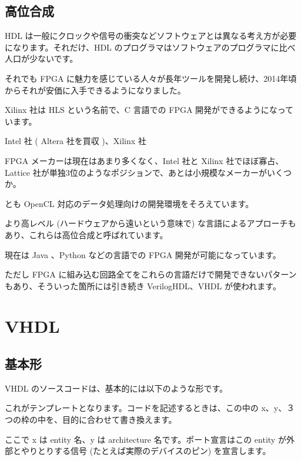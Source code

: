 \documentclass[letterpaper,10pt,dvipdfmx]{sphinxmanual}
\begin{document}
\section{高位合成}
\label{\detokenize{03_fpga:id1}}
HDL は一般にクロックや信号の衝突などソフトウェアとは異なる考え方が必要になります。それだけ、HDL のプログラマはソフトウェアのプログラマに比べ人口が少ないです。

それでも FPGA に魅力を感じている人々が長年ツールを開発し続け、2014年頃からそれが安価に入手できるようになりました。

Xilinx 社は HLS という名前で、C 言語での FPGA 開発ができるようになっています。

Intel 社 ( Altera 社を買収 )、Xilinx 社 %
\begin{footnote}[1]\sphinxAtStartFootnote
FPGA メーカーは現在はあまり多くなく、Intel 社と Xilinx 社でほぼ寡占、Lattice 社が単独3位のようなポジションで、あとは小規模なメーカーがいくつか。
%
\end{footnote} とも OpenCL 対応のデータ処理向けの開発環境をそろえています。

より高レベル (ハードウェアから遠いという意味で) な言語によるアプローチもあり、これらは高位合成と呼ばれています。

現在は Java 、Python などの言語での FPGA 開発が可能になっています。

ただし FPGA に組み込む回路全てをこれらの言語だけで開発できないパターンもあり、そういった箇所には引き続き VerilogHDL、VHDL が使われます。


\chapter{VHDL}
\label{\detokenize{04_vhdl:vhdl}}\label{\detokenize{04_vhdl::doc}}

\section{基本形}
\label{\detokenize{04_vhdl:id1}}
VHDL のソースコードは、基本的には以下のような形です。

\begin{figure}[htbp]
\centering

\noindent{}
\end{figure}

これがテンプレートとなります。コードを記述するときは、この中の x、y、３つの枠の中を、目的に合わせて書き換えます。

ここで x は entity 名、y は architecture 名です。ポート宣言はこの entity が外部とやりとりする信号 (たとえば実際のデバイスのピン) を宣言します。
\end{document}
